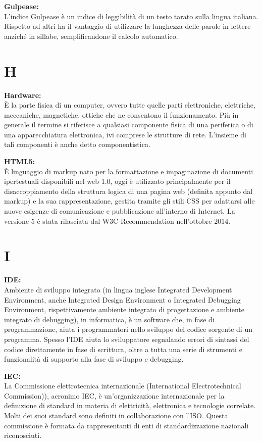 \documentclass[a4paper, oneside, openany, dvipsnames, table]{article}
\begin{document}
\textbf{Gulpease:} \\  L'indice Gulpease è un indice di leggibilità di un testo tarato sulla lingua italiana. Rispetto ad altri ha il vantaggio di utilizzare la lunghezza delle parole in lettere anziché in sillabe, semplificandone il calcolo automatico.

\newpage
\section{H}
\textbf{Hardware:}\\	\`E la parte fisica di un computer, ovvero tutte quelle parti elettroniche, elettriche, meccaniche, magnetiche, ottiche che ne consentono il funzionamento. Più in generale il termine si riferisce a qualsiasi componente fisica di una periferica o di una apparecchiatura elettronica, ivi comprese le strutture di rete. L'insieme di tali componenti è anche detto componentistica.

\textbf{HTML5:}\\	\`E linguaggio di markup nato per la formattazione e impaginazione di documenti ipertestuali disponibili nel web 1.0, oggi è utilizzato principalmente per il disaccoppiamento della struttura logica di una pagina web (definita appunto dal markup)
 e la sua rappresentazione, gestita tramite gli stili CSS per adattarsi alle nuove esigenze di comunicazione e pubblicazione all'interno di Internet. La versione 5 è stata rilasciata dal W3C Recommendation nell'ottobre 2014.

\newpage
\section{I}
\textbf{IDE:}\\	Ambiente di sviluppo integrato (in lingua inglese Integrated Development Environment, anche Integrated Design Environment o Integrated Debugging Environment, rispettivamente ambiente integrato di progettazione e ambiente integrato di debugging), in informatica, è un software che, in fase di programmazione, aiuta i programmatori nello sviluppo del codice sorgente di un programma. Spesso l'IDE aiuta lo sviluppatore segnalando errori di sintassi del codice direttamente in fase di scrittura, oltre a tutta una serie di strumenti e funzionalità di supporto alla fase di sviluppo e debugging.

\textbf{IEC:}\\	La Commissione elettrotecnica internazionale (International Electrotechnical Commission)), 
acronimo IEC, è un'organizzazione internazionale 
per la definizione di standard in materia di elettricità, elettronica e tecnologie correlate. Molti dei suoi standard sono 
definiti in collaborazione con l'ISO. Questa commissione è formata da 
rappresentanti di enti di standardizzazione nazionali riconosciuti.
\end{document}
